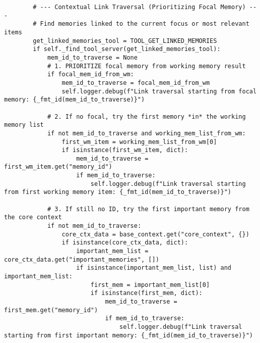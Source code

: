 \documentclass[12pt,a4paper]{article}
\begin{document}
\begin{pageablecode}
\begin{verbatim}
        # --- Contextual Link Traversal (Prioritizing Focal Memory) ---
        # Find memories linked to the current focus or most relevant items
        get_linked_memories_tool = TOOL_GET_LINKED_MEMORIES
        if self._find_tool_server(get_linked_memories_tool):
            mem_id_to_traverse = None
            # 1. PRIORITIZE focal memory from working memory result
            if focal_mem_id_from_wm:
                mem_id_to_traverse = focal_mem_id_from_wm
                self.logger.debug(f"Link traversal starting from focal memory: {_fmt_id(mem_id_to_traverse)}")

            # 2. If no focal, try the first memory *in* the working memory list
            if not mem_id_to_traverse and working_mem_list_from_wm:
                first_wm_item = working_mem_list_from_wm[0]
                if isinstance(first_wm_item, dict):
                    mem_id_to_traverse = first_wm_item.get("memory_id")
                    if mem_id_to_traverse:
                        self.logger.debug(f"Link traversal starting from first working memory item: {_fmt_id(mem_id_to_traverse)}")

            # 3. If still no ID, try the first important memory from the core context
            if not mem_id_to_traverse:
                core_ctx_data = base_context.get("core_context", {})
                if isinstance(core_ctx_data, dict):
                    important_mem_list = core_ctx_data.get("important_memories", [])
                    if isinstance(important_mem_list, list) and important_mem_list:
                        first_mem = important_mem_list[0]
                        if isinstance(first_mem, dict):
                            mem_id_to_traverse = first_mem.get("memory_id")
                            if mem_id_to_traverse:
                                self.logger.debug(f"Link traversal starting from first important memory: {_fmt_id(mem_id_to_traverse)}")


\end{verbatim}
\end{pageablecode}
\end{document}

